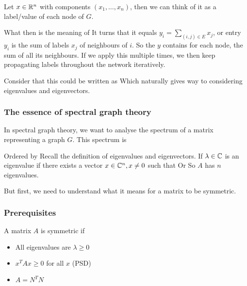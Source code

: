     Let $x \in \mathbb{R}^n$ with components $(x_1, \dots, x_n)$, then we can think of it as a label/value of each node of $G$. 
    
    What then is the meaning of 
    It turns that it equals $y_i = \sum_{(i, j) \in E}{x_j}$, or entry $y_i$ is the sum of labels $x_j$ of neighbours of $i$. So the $y$ contains for each node, the sum of all its neighbours. If we apply this multiple times, we then keep propagating labels throughout the network iteratively. 
    
    Consider that this could be written as  
    Which naturally gives way to considering eigenvalues and eigenvectors. 
    
    \subsubsection{The essence of spectral graph theory}
        In spectral graph theory, we want to analyse the spectrum of a matrix representing a graph $G$. This spectrum is
        
        Ordered by 
        Recall the definition of eigenvalues and eigenvectors. If $\lambda \in \mathbb{C}$ is an eigenvalue if there exists a vector $x \in \mathbb{C}^n, x \neq 0$ such that 
        Or 
        So $A$ has $n$ eigenvalues.
        
        But first, we need to understand what it means for a matrix to be symmetric.
    
    \subsubsection{Prerequisites}    
    
        A matrix $A$ is symmetric if
        \begin{itemize}
            \item All eigenvalues are $\lambda \geq 0$
            \item $x^T Ax \geq 0$ for all $x$ (PSD)
            \item $A = N^TN$
        \end{itemize}
        
